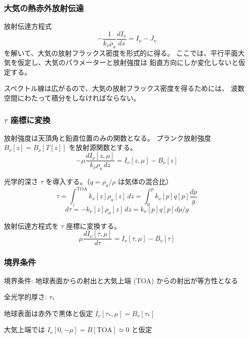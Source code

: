 \documentclass[unicode,colorlinks]{beamer}
\newcommand{\Unit}[1]{\,\mathrm{#1}}
\begin{document}
\begin{frame}
	\frametitle{大気の熱赤外放射伝達}
	放射伝達方程式
	\[-\frac{1}{k_\nu \rho_a}\frac{dI_\nu}{ds}=I_\nu-J_\nu\]
	を解いて、大気の放射フラックス密度を形式的に得る。
	ここでは、平行平面大気を仮定し、大気のパラメーターと放射強度は
	鉛直方向にしか変化しないと仮定する。

	スペクトル線は広がるので、大気の放射フラックス密度を得るためには、
	波数空間にわたって積分をしなければならない。
\end{frame}

% 

\begin{frame}
	\frametitle{$\tau$ 座標に変換}
	放射強度は天頂角と鉛直位置のみの関数となる。
	プランク放射強度 $B_\nu[z]=B_\nu[T[z]]$ を放射源関数とする。
	\[-\mu\frac{dI_\nu[z,\mu]}{k_\nu\rho_a\,dz}=I_\nu[z,\mu]-B_\nu[z]\]

	光学的深さ $\tau$ を導入する。（$q=\rho_a/\rho$ は気体の混合比）
	\[\tau=\int^{\mathrm{TOA}}_{z} k_\nu[z]\rho_a[z]\,dz=\int^p_0 k_\nu[p]q[p]\frac{dp}{g}\]
	\[d\tau=-k_\nu[z]\rho_a[z]\,dz=k_\nu[p]q[p]dp/g\]

	放射伝達方程式を $\tau$ 座標に変換する。
	\[\mu\frac{dI_\nu[\tau,\mu]}{d\tau}=I_\nu[\tau,\mu]-B_\nu[\tau]\]
\end{frame}

\begin{frame}
	\frametitle{境界条件}
	境界条件: 地球表面からの射出と大気上端 (TOA) からの射出が等方性となる

	全光学的厚さ: $\tau_*$

	地球表面は赤外で黒体と仮定 $I_\nu[\tau_*,\mu]=B_\nu[\tau_*]$

	大気上端では $I_\nu[0,-\mu]=B[\mathrm{TOA}]\simeq0$ と仮定
\end{frame}
\end{document}
